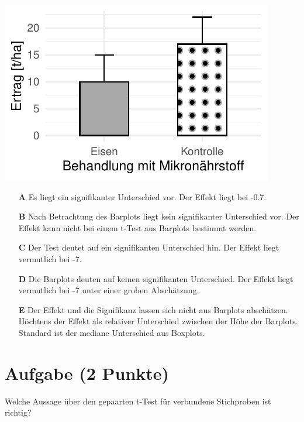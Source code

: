 \documentclass[a4paper, 9pt]{scrartcl}\usepackage[]{graphicx}\usepackage[]{xcolor}
\makeatletter
\def\maxwidth{ %
  \ifdim\Gin@nat@width>\linewidth
    \linewidth
  \else
    \Gin@nat@width
  \fi
}
\makeatother
\begin{document}
{\centering \includegraphics[width=\maxwidth]{img/mc-testing-ttest-02-1} 

}







\begin{enumerate}
\item [\textbf{A} \msquare] Es liegt ein signifikanter Unterschied vor. Der Effekt liegt bei -0.7.
\item [\textbf{B} \msquare] Nach Betrachtung des Barplots liegt kein signifikanter Unterschied vor. Der Effekt kann nicht bei einem t-Test aus Barplots bestimmt werden.
\item [\textbf{C} \msquare] Der Test deutet auf ein signifikanten Unterschied hin. Der Effekt liegt vermutlich bei -7.
\item [\textbf{D} \msquare] Die Barplots deuten auf keinen signifikanten Unterschied. Der Effekt liegt vermutlich bei -7 unter einer groben Abschätzung.
\item [\textbf{E} \msquare] Der Effekt und die Signifikanz lassen sich nicht aus Barplots abschätzen. Höchtens der Effekt als relativer Unterschied zwischen der Höhe der Barplots. Standard ist der mediane Unterschied aus Boxplots.
\end{enumerate}

\section{Aufgabe \hfill (2 Punkte)}




Welche Aussage über den gepaarten t-Test für verbundene Stichproben ist richtig?
\end{document}
